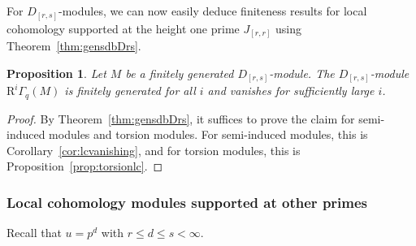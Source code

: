 \documentclass[12pt]{amsart}
\newcommand{\rR}{\mathrm{R}}
\newcommand{\Drs}{D_{[r,s]}}
\newcommand{\Jrr}{J_{[r,r]}}
\newcommand{\mGaq}{\Gamma_{q}}
\numberwithin{equation}{section}
\newtheorem{proposition}[equation]{Proposition}
\theoremstyle{definition}
\theoremstyle{plain}
\begin{document}
For $\Drs$-modules, we can now easily deduce finiteness results for local cohomology supported at the height one prime $\Jrr$ using Theorem~\ref{thm:gensdbDrs}.
\begin{proposition}\label{prop:lcfinitenessDrs}
   Let $M$ be a finitely generated $\Drs$-module. The $\Drs$-module $\rR^i\mGaq(M)$ is finitely generated for all $i$ and vanishes for sufficiently large $i$. 
\end{proposition}
\begin{proof}
By Theorem~\ref{thm:gensdbDrs}, it suffices to prove the claim for semi-induced modules and torsion modules. For semi-induced modules, this is Corollary~\ref{cor:lcvanishing}, and for torsion modules, this is Proposition~\ref{prop:torsionlc}.
\end{proof}

\subsubsection*{Local cohomology modules supported at other primes}
Recall that $u = p^d$ with $r \leq d \leq s < \infty$. 
\end{document}
